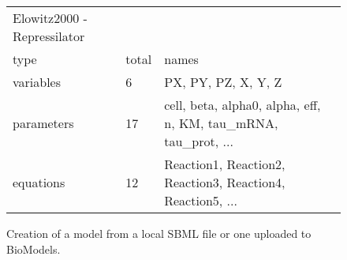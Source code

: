 \begin{figure}[t]

\begin{minipage}[t]{\linewidth}

{\centering 

\begin{Shaded}
\begin{Highlighting}[]

\OperatorTok{=}\NormalTok{)  }
\OperatorTok{=}\NormalTok{)  }
\end{Highlighting}
\end{Shaded}

\begin{longtable}{@{}lll@{}}
    \toprule\noalign{}
    Elowitz2000 - Repressilator \\
    type & total & names \\
    \midrule\noalign{}
    \endhead
    \bottomrule\noalign{}
    \endlastfoot
    variables  &  6 & PX, PY, PZ, X, Y, Z \\
    parameters & 17 & cell, beta, alpha0, alpha, eff, n, KM, tau\_mRNA, tau\_prot, ... \\
    equations  & 12 & Reaction1, Reaction2, Reaction3, Reaction4, Reaction5, ... \\
\end{longtable}

}

\end{minipage}%

\caption{\label{fig-simbio-io}Creation of a model from a local SBML file
or one uploaded to BioModels.}

\end{figure}
